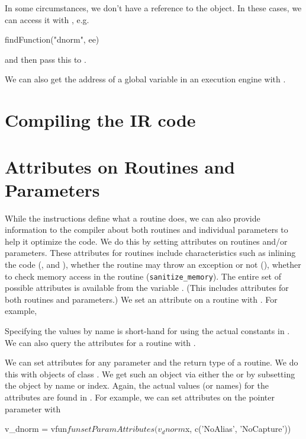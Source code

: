 In some circumstances, we don't have a reference to the
 object. In these cases, we can access it with
, e.g.
\begin{RCode}
findFunction("dnorm", ee)
\end{RCode}
and then pass this to .

We can also get the address of a global variable in an execution
engine with .


\section{Compiling the IR code}


\section{Attributes on Routines and Parameters}
While the instructions define what a routine does, we can also provide
information to the \llvm{} compiler about both routines and individual
parameters to help it optimize the code.  We do this by setting
attributes on routines and/or parameters.  These attributes for
routines include characteristics such as inlining the code
(,  and ), whether the routine may throw
an exception or not (), whether to check memory access in the
routine (\verb+sanitize_memory+).
The entire set of possible attributes is available from the variable
. (This includes attributes
for both routines and parameters.)
We set an attribute on a routine with .
For example, 
Specifying the values by name is short-hand for using the actual
constants in .
We can also query the attributes for a routine with
.

We can set attributes for any parameter and the
return type of a routine. %
We do this with objects of class .
We get such an object via either the  or 
by subsetting the  object by name or index.
Again, the actual values (or names) for the attributes are found in
.
For example, we can set attributes on the pointer parameter 
with
\begin{RCode}
v_dnorm = vfun$fun
setParamAttributes(v_dnorm$x, c('NoAlias', 'NoCapture'))
\end{RCode}

